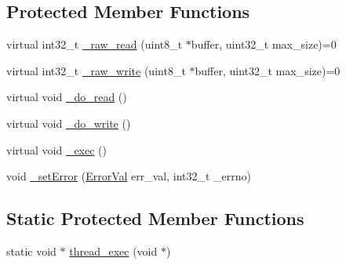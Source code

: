 \subsection*{Protected Member Functions}
\begin{DoxyCompactItemize}
\item 
virtual int32\-\_\-t \hyperlink{classedthreaded__fd_a3ead513fc5aa5b33e18a6b7246091ee9}{\-\_\-raw\-\_\-read} (uint8\-\_\-t $\ast$buffer, uint32\-\_\-t max\-\_\-size)=0
\item 
virtual int32\-\_\-t \hyperlink{classedthreaded__fd_a0151298dfd0c91b95d27649031c5fa53}{\-\_\-raw\-\_\-write} (uint8\-\_\-t $\ast$buffer, uint32\-\_\-t max\-\_\-size)=0
\item 
virtual void \hyperlink{classedthreaded__fd_a251c391b913e2c151eb8840773f505c0}{\-\_\-do\-\_\-read} ()
\item 
virtual void \hyperlink{classedthreaded__fd_a0f6def6ed7b6147aad0f7007bcff83ee}{\-\_\-do\-\_\-write} ()
\item 
virtual void \hyperlink{classedthreaded__fd_a42c7b3bc22648ebbc71a1daeb1ac2535}{\-\_\-exec} ()
\item 
void \hyperlink{classedthreaded__fd_acf2f0e638887933b62229bf543c8733d}{\-\_\-set\-Error} (\hyperlink{classedthreaded__fd_ab3562872429271887a15489b7a1a17d7}{Error\-Val} err\-\_\-val, int32\-\_\-t \-\_\-errno)
\end{DoxyCompactItemize}
\subsection*{Static Protected Member Functions}
\begin{DoxyCompactItemize}
\item 
static void $\ast$ \hyperlink{classedthreaded__fd_a7fbc6179a5ea6829529d01c94a659053}{thread\-\_\-exec} (void $\ast$)
\end{DoxyCompactItemize}
